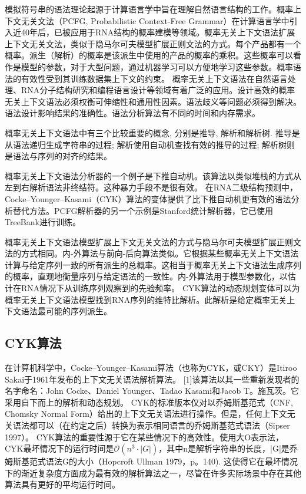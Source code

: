 模拟符号串的语法理论起源于计算语言学中旨在理解自然语言结构的工作。概率上下文无关文法（PCFG, Probabilistic Context-Free Grammar）在计算语言学中引入近40年后，已被应用于RNA结构的概率建模等领域。概率无关上下文语法扩展上下文无关文法，类似于隐马尔可夫模型扩展正则文法的方式。每个产品都有一个概率。派生（解析）的概率是该派生中使用的产品的概率的乘积。这些概率可以看作是模型的参数，对于大型问题，通过机器学习可以方便地学习这些参数。概率语法的有效性受到其训练数据集上下文的约束。
概率无关上下文语法在自然语言处理、RNA分子结构研究和编程语言设计等领域有着广泛的应用。设计高效的概率无关上下文语法必须权衡可伸缩性和通用性因素。语法歧义等问题必须得到解决。语法设计影响结果的准确性。语法分析算法有不同的时间和内存需求。

概率无关上下文语法中有三个比较重要的概念, 分别是推导, 解析和解析树. 推导是从语法递归生成字符串的过程; 解析使用自动机查找有效的推导的过程; 解析树则是语法与序列的对齐的结果。

概率无关上下文语法分析器的一个例子是下推自动机。该算法以类似堆栈的方式从左到右解析语法非终结符。这种暴力手段不是很有效。
在RNA二级结构预测中，Cocke–Younger–Kasami（CYK）算法的变体提供了比下推自动机更有效的语法分析替代方法。PCFG解析器的另一个示例是Stanford统计解析器，它已使用TreeBank进行训练。

概率无关上下文语法模型扩展上下文无关文法的方式与隐马尔可夫模型扩展正则文法的方式相同。内-外算法与前向-后向算法类似。它根据某些概率无关上下文语法计算与给定序列一致的所有派生的总概率。这相当于概率无关上下文语法生成序列的概率，直观地衡量序列与给定语法的一致性。内-外算法用于模型参数化，以估计在RNA情况下从训练序列观察到的先验频率。
CYK算法的动态规划变体可以为概率无关上下文语法模型找到RNA序列的维特比解析。此解析是给定概率无关上下文语法最可能的序列派生。

\subsection{CYK算法}

在计算机科学中，Cocke–Younger–Kasami算法（也称为CYK，或CKY）是Itiroo Sakai于1961年发布的上下文无关语法解析算法。
[1]该算法以其一些重新发现者的名字命名：John Cocke、Daniel Younger、Tadao Kasami和Jacob T。施瓦茨。它采用自下而上的解析和动态规划。
CYK的标准版本仅对以乔姆斯基范式（CNF, Chomsky Normal Form）给出的上下文无关语法进行操作。但是，任何上下文无关语法都可以（在约定之后）转换为表示相同语言的乔姆斯基范式语法（Sipser 1997）。
CYK算法的重要性源于它在某些情况下的高效性。使用大O表示法，CYK最坏情况下的运行时间是$\displaystyle \mathcal{O} (n^{3} \cdot |G|)$，其中n是解析字符串的长度，|G|是乔姆斯基范式语法G的大小（Hopcroft Ullman 1979，p。140). 
这使得它在最坏情况下的渐近复杂度方面成为最有效的解析算法之一，尽管在许多实际场景中存在其他算法具有更好的平均运行时间。

